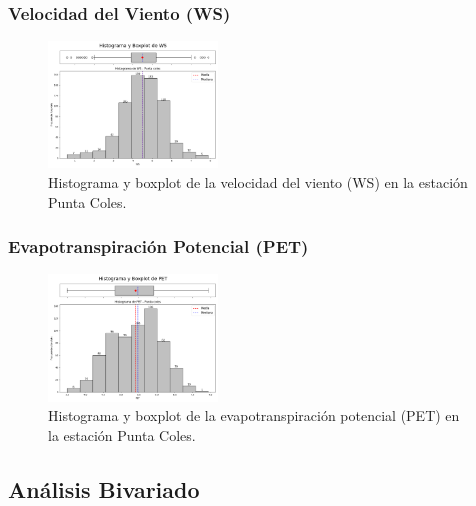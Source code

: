 \subsubsection*{Velocidad del Viento (WS)}
\begin{figure}[H]
\centering
\includegraphics[width=0.4\textwidth]{resultados/por_estacion_meteorologica/Punta_Coles/WS_histograma.png}
\caption{Histograma y boxplot de la velocidad del viento (WS) en la estación Punta Coles.}
\label{fig:punta_coles_WS}
\end{figure}

\subsubsection*{Evapotranspiración Potencial (PET)}
\begin{figure}[H]
\centering
\includegraphics[width=0.4\textwidth]{resultados/por_estacion_meteorologica/Punta_Coles/PET_histograma.png}
\caption{Histograma y boxplot de la evapotranspiración potencial (PET) en la estación Punta Coles.}
\label{fig:punta_coles_PET}
\end{figure}

\subsection{Análisis Bivariado}

